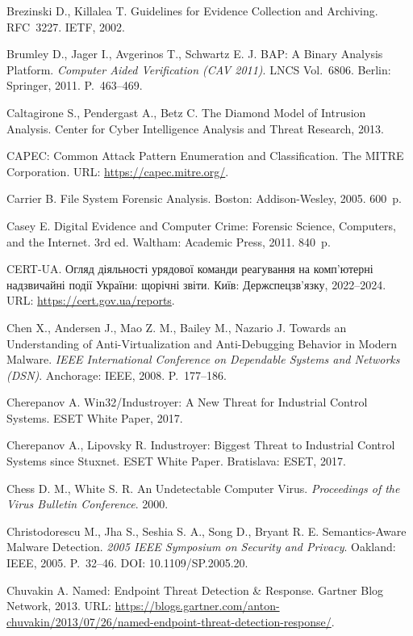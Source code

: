  Brezinski D., Killalea T. Guidelines for Evidence Collection and Archiving. RFC~3227. IETF, 2002.

 Brumley D., Jager I., Avgerinos T., Schwartz E. J. BAP: A Binary Analysis Platform. \emph{Computer Aided Verification (CAV 2011)}. LNCS Vol.~6806. Berlin: Springer, 2011. P.~463--469.

 Caltagirone S., Pendergast A., Betz C. The Diamond Model of Intrusion Analysis. Center for Cyber Intelligence Analysis and Threat Research, 2013.

 CAPEC: Common Attack Pattern Enumeration and Classification. The MITRE Corporation. URL: \url{https://capec.mitre.org/}.

 Carrier B. File System Forensic Analysis. Boston: Addison-Wesley, 2005. 600~p.

 Casey E. Digital Evidence and Computer Crime: Forensic Science, Computers, and the Internet. 3rd ed. Waltham: Academic Press, 2011. 840~p.

 CERT-UA. Огляд діяльності урядової команди реагування на комп'ютерні надзвичайні події України: щорічні звіти. Київ: Держспецзв'язку, 2022--2024. URL: \url{https://cert.gov.ua/reports}.

 Chen X., Andersen J., Mao Z. M., Bailey M., Nazario J. Towards an Understanding of Anti-Virtualization and Anti-Debugging Behavior in Modern Malware. \emph{IEEE International Conference on Dependable Systems and Networks (DSN)}. Anchorage: IEEE, 2008. P.~177--186.

 Cherepanov A. Win32/Industroyer: A New Threat for Industrial Control Systems. ESET White Paper, 2017.

 Cherepanov A., Lipovsky R. Industroyer: Biggest Threat to Industrial Control Systems since Stuxnet. ESET White Paper. Bratislava: ESET, 2017.

 Chess D. M., White S. R. An Undetectable Computer Virus. \emph{Proceedings of the Virus Bulletin Conference}. 2000.

 Christodorescu M., Jha S., Seshia S. A., Song D., Bryant R. E. Semantics-Aware Malware Detection. \emph{2005 IEEE Symposium on Security and Privacy}. Oakland: IEEE, 2005. P.~32--46. DOI: 10.1109/SP.2005.20.

 Chuvakin A. Named: Endpoint Threat Detection \& Response. Gartner Blog Network, 2013. URL: \url{https://blogs.gartner.com/anton-chuvakin/2013/07/26/named-endpoint-threat-detection-response/}.

